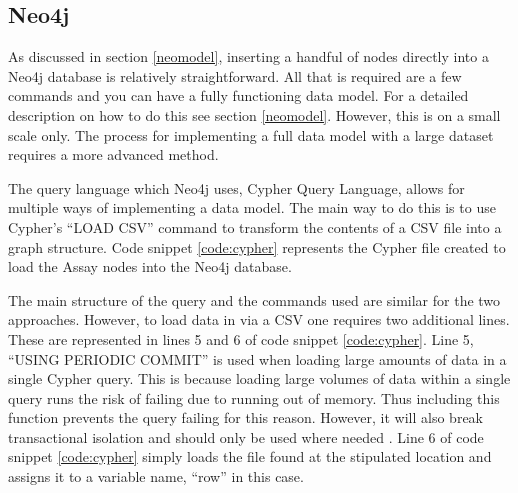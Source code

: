 \subsection{Neo4j}\label{neoload}
As discussed in section \ref{neomodel}, inserting a handful of nodes directly into a Neo4j database is relatively straightforward. All that is required are a few commands and you can have a fully functioning data model. For a detailed description on how to do this see section \ref{neomodel}. However, this is on a small scale only. The process for implementing a full data model with a large dataset requires a more advanced method.

The query language which Neo4j uses, Cypher Query Language, allows for multiple ways of implementing a data model. The main way to do this is to use Cypher's ``LOAD CSV'' command to transform the contents of a CSV file into a graph structure. Code snippet \ref{code:cypher} represents the Cypher file created to load the Assay nodes into the Neo4j database.

The main structure of the query and the commands used are similar for the two approaches. However, to load data in via a CSV one requires two additional lines. These are represented in lines 5 and 6 of code snippet \ref{code:cypher}. Line 5, ``USING PERIODIC COMMIT'' is used when loading large amounts of data in a single Cypher query. This is because loading large volumes of data within a single query runs the risk of failing due to running out of memory. Thus including this function prevents the query failing for this reason. However, it will also break transactional isolation and should only be used where needed \cite{ndweb}. Line 6 of code snippet \ref{code:cypher} simply loads the file found at the stipulated location and assigns it to a variable name, ``row'' in this case.

